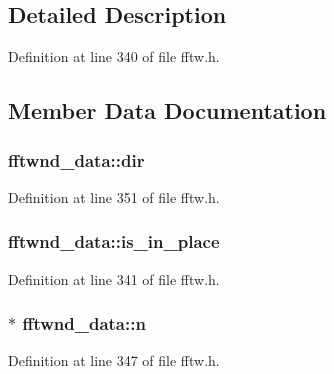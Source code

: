 \subsection{Detailed Description}


Definition at line 340 of file fftw.\+h.



\subsection{Member Data Documentation}
\subsubsection[{\texorpdfstring{dir}{dir}}]{ fftwnd\+\_\+data\+::dir}\hypertarget{structfftwnd__data_af6539f7692dda806b475e2601063155f}{}\label{structfftwnd__data_af6539f7692dda806b475e2601063155f}


Definition at line 351 of file fftw.\+h.

\subsubsection[{\texorpdfstring{is\+\_\+in\+\_\+place}{is_in_place}}]{ fftwnd\+\_\+data\+::is\+\_\+in\+\_\+place}\hypertarget{structfftwnd__data_ad93f931868ab59241f4accb107a094a9}{}\label{structfftwnd__data_ad93f931868ab59241f4accb107a094a9}


Definition at line 341 of file fftw.\+h.

\subsubsection[{\texorpdfstring{n}{n}}]{$\ast$ fftwnd\+\_\+data\+::n}\hypertarget{structfftwnd__data_a3fa54e48b6012a8ad3075d261165e9ba}{}\label{structfftwnd__data_a3fa54e48b6012a8ad3075d261165e9ba}


Definition at line 347 of file fftw.\+h.

